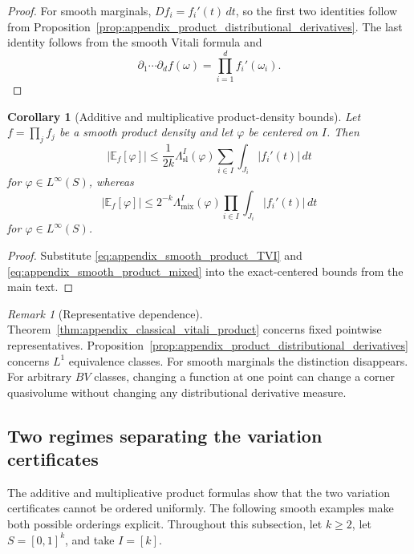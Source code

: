 \documentclass[11pt,letterpaper]{article}
\newtheorem{corollary}[theorem]{Corollary}
\theoremstyle{definition}
\theoremstyle{remark}
\newtheorem{remark}[theorem]{Remark}
\begin{document}
\begin{proof}
For smooth marginals, $Df_i=f_i'(t)\,dt$, so the first two identities follow
from Proposition~\ref{prop:appendix_product_distributional_derivatives}. The
last identity follows from the smooth Vitali formula and
$$
\partial_1\cdots\partial_d f(\omega)=\prod_{i=1}^d f_i'(\omega_i).
$$
\end{proof}

\begin{corollary}[Additive and multiplicative product-density bounds]
\label{cor:appendix_additive_multiplicative_bounds}
Let $f=\prod_jf_j$ be a smooth product density and let $\varphi$ be centered
on $I$. Then
$$
|\mathbb E_f[\varphi]|
\le
\frac1{2k}\Lambda_{\mathrm{sl}}^I(\varphi)
\sum_{i\in I}\int_{J_i}|f_i'(t)|\,dt
$$
for $\varphi\in L^\infty(S)$, whereas
$$
|\mathbb E_f[\varphi]|
\le
2^{-k}\Lambda_{\mathrm{mix}}^I(\varphi)
\prod_{i\in I}\int_{J_i}|f_i'(t)|\,dt
$$
for $\varphi\in L^\infty(S)$.
\end{corollary}

\begin{proof}
Substitute \eqref{eq:appendix_smooth_product_TVI} and
\eqref{eq:appendix_smooth_product_mixed} into the exact-centered bounds from
the main text.
\end{proof}

\begin{remark}[Representative dependence]
\label{rem:appendix_representative_distinction}
Theorem~\ref{thm:appendix_classical_vitali_product} concerns fixed pointwise
representatives. Proposition~\ref{prop:appendix_product_distributional_derivatives}
concerns $L^1$ equivalence classes. For smooth marginals the distinction
disappears. For arbitrary $BV$ classes, changing a function at one point can
change a corner quasivolume without changing any distributional derivative
measure.
\end{remark}

  
\subsection{Two regimes separating the variation certificates}
\label{subsec:appendix_branch_separation}
  

The additive and multiplicative product formulas show that the two variation
certificates cannot be ordered uniformly. The following smooth examples make
both possible orderings explicit. Throughout this subsection, let $k\ge2$,
let $S=[0,1]^k$, and take $I=[k]$.
\end{document}
